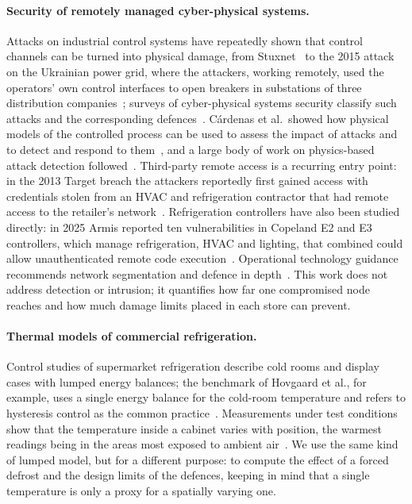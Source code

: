 \documentclass{ceurart}
\begin{document}
\paragraph{Security of remotely managed cyber-physical systems.}
Attacks on industrial control systems have repeatedly shown that control channels can be turned into physical damage, from Stuxnet~\cite{langner2011stuxnet} to the 2015 attack on the Ukrainian power grid, where the attackers, working remotely, used the operators' own control interfaces to open breakers in substations of three distribution companies~\cite{lee2016ukraine}; surveys of cyber-physical systems security classify such attacks and the corresponding defences~\cite{humayed2017cps}.
C\'ardenas et al.\ showed how physical models of the controlled process can be used to assess the impact of attacks and to detect and respond to them~\cite{cardenas2011attacks}, and a large body of work on physics-based attack detection followed~\cite{giraldo2018survey}.
Third-party remote access is a recurring entry point: in the 2013 Target breach the attackers reportedly first gained access with credentials stolen from an HVAC and refrigeration contractor that had remote access to the retailer's network~\cite{senate2014target}.
Refrigeration controllers have also been studied directly: in 2025 Armis reported ten vulnerabilities in Copeland E2 and E3 controllers, which manage refrigeration, HVAC and lighting, that combined could allow unauthenticated remote code execution~\cite{armis2025frostbyte}.
Operational technology guidance recommends network segmentation and defence in depth~\cite{nist80082r3}.
This work does not address detection or intrusion; it quantifies how far one compromised node reaches and how much damage limits placed in each store can prevent.

\paragraph{Thermal models of commercial refrigeration.}
Control studies of supermarket refrigeration describe cold rooms and display cases with lumped energy balances; the benchmark of Hovgaard et al., for example, uses a single energy balance for the cold-room temperature and refers to hysteresis control as the common practice~\cite{hovgaard2011benchmark}.
Measurements under test conditions show that the temperature inside a cabinet varies with position, the warmest readings being in the areas most exposed to ambient air~\cite{evans2007cabinets}.
We use the same kind of lumped model, but for a different purpose: to compute the effect of a forced defrost and the design limits of the defences, keeping in mind that a single temperature is only a proxy for a spatially varying one.
\end{document}
